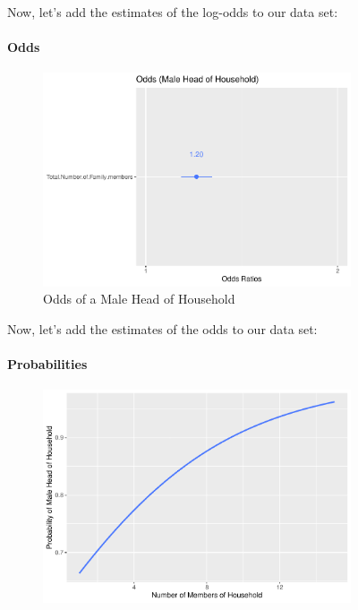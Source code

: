 \documentclass[
]{article}
\begin{document}
\begin{figure}[H]
Now, let's add the estimates of the log-odds to our data set:

\hypertarget{odds}{%
\paragraph{Odds}\label{odds}}

\begin{figure}[H]

{\centering \includegraphics[width=0.8\linewidth]{Group_01_Project2_demo_files/figure-latex/model plot-1} 

}

\caption{Odds of a Male Head of Household}\label{fig:model plot}
\end{figure}

Now, let's add the estimates of the odds to our data set:

\hypertarget{probabilities}{%
\paragraph{Probabilities}\label{probabilities}}

\begin{figure}[H]

{\centering \includegraphics[width=0.8\linewidth]{Group_01_Project2_demo_files/figure-latex/probability plot-1} 

}
\end{figure}
\end{figure}
\end{document}
